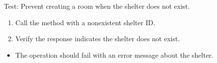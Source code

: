 \documentclass[letterpaper,10pt,english]{sphinxmanual}
\begin{document}
\begin{fulllineitems}
\label{\detokenize{test:test.test_room.test_create_room_shelter_not_exist}}
\pysigstartsignatures
\pysiglinewithargsret
{}
{}
{}
\pysigstopsignatures
\sphinxAtStartPar
Test: Prevent creating a room when the shelter does not exist.
\begin{description}
\begin{enumerate}
%
\item {} 
\sphinxAtStartPar
Call the  method with a nonexistent shelter ID.

\item {} 
\sphinxAtStartPar
Verify the response indicates the shelter does not exist.

\end{enumerate}

\begin{itemize}
\item {} 
\sphinxAtStartPar
The operation should fail with an error message about the shelter.

\end{itemize}

\end{description}

\end{fulllineitems}

\end{document}
